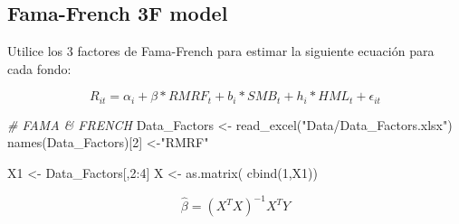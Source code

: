 \documentclass[
  12pt,
]{article}
\newenvironment{Shaded}{\begin{snugshade}}{\end{snugshade}}
\newcommand{\CommentTok}[1]{\textcolor[rgb]{0.56,0.35,0.01}{\textit{#1}}}
\newcommand{\ControlFlowTok}[1]{\textcolor[rgb]{0.13,0.29,0.53}{\textbf{#1}}}
\newcommand{\DecValTok}[1]{\textcolor[rgb]{0.00,0.00,0.81}{#1}}
\newcommand{\FunctionTok}[1]{\textcolor[rgb]{0.00,0.00,0.00}{#1}}
\newcommand{\NormalTok}[1]{#1}
\newcommand{\OtherTok}[1]{\textcolor[rgb]{0.56,0.35,0.01}{#1}}
\newcommand{\SpecialCharTok}[1]{\textcolor[rgb]{0.00,0.00,0.00}{#1}}
\newcommand{\StringTok}[1]{\textcolor[rgb]{0.31,0.60,0.02}{#1}}
\begin{document}
\hypertarget{fama-french-3f-model}{%
\subsection{Fama-French 3F model}\label{fama-french-3f-model}}

Utilice los 3 factores de Fama-French para estimar la siguiente ecuación
para cada fondo:

\[
R_{it}=\alpha_i+\beta \ast RMRF_t +b_i \ast SMB_t +h_i \ast HML_t + \epsilon_{it}
\]

\begin{Shaded}
\begin{Highlighting}[]
\CommentTok{\# FAMA \& FRENCH}
\NormalTok{Data\_Factors }\OtherTok{\textless{}{-}} \FunctionTok{read\_excel}\NormalTok{(}\StringTok{"Data/Data\_Factors.xlsx"}\NormalTok{)}
\FunctionTok{names}\NormalTok{(Data\_Factors)[}\DecValTok{2}\NormalTok{] }\OtherTok{\textless{}{-}}\StringTok{"RMRF"}
\end{Highlighting}
\end{Shaded}

\begin{Shaded}
\end{Shaded}

\begin{Shaded}
\begin{Highlighting}[]
\NormalTok{X1 }\OtherTok{\textless{}{-}}\NormalTok{ Data\_Factors[,}\DecValTok{2}\SpecialCharTok{:}\DecValTok{4}\NormalTok{]}
\NormalTok{X }\OtherTok{\textless{}{-}} \FunctionTok{as.matrix}\NormalTok{( }\FunctionTok{cbind}\NormalTok{(}\DecValTok{1}\NormalTok{,X1))}
\end{Highlighting}
\end{Shaded}

\[
\hat{\beta}=(X^TX)^{-1}X^TY
\]
\end{document}
